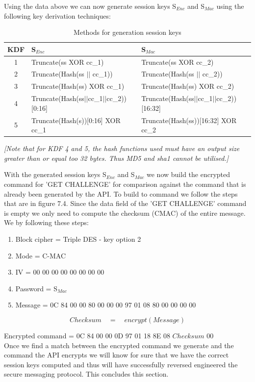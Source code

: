 \documentclass[bsc,frontabs,twoside,singlespacing,parskip,deptreport]{infthesis}     %
\begin{document}
Using the data above we can now generate session keys S$_{Enc}$ and S$_{Mac}$ using the following key derivation techniques:

\begin{table}[H]
\begin{tabular}{|c|l|l|}
\hline
KDF & S$_{Enc}$ & S$_{Mac}$\\
\hline
1 & Truncate(ss XOR cc\_1) & Truncate(ss XOR cc\_2)\\
\hline
2 & Truncate(Hash(ss $||$ cc\_1)) & Truncate(Hash(ss $||$ cc\_2)) \\
\hline
3 & Truncate(Hash(ss) XOR cc\_1) & Truncate(Hash(ss) XOR cc\_2)\\
\hline
4 & Truncate(Hash(ss$||$cc\_1$||$cc\_2))[0:16] & Truncate(Hash(ss$||$cc\_1$||$cc\_2))[16:32]\\
\hline
5 & Truncate(Hash(s))[0:16] XOR cc\_1 & Truncate(Hash(ss))[16:32] XOR cc\_2\\
\hline
\end{tabular}
\caption{Methods for generation session keys}
\end{table}

\textit{[Note that for KDF 4 and 5, the hash functions used must have an output size greater than or equal too 32 bytes. Thus MD5 and sha1 cannot be utilised.]}

With the generated session keys S$_{Enc}$ and S$_{Mac}$ we now build the encrypted command for 'GET CHALLENGE' for comparison against the command that is already been generated by the API. To build to command we follow the steps that are in figure 7.4. Since the data field of the 'GET CHALLENGE' command is empty we only need to compute the checksum (CMAC) of the entire message. We by following these steps:

\begin{enumerate}
\item Block cipher = Triple DES - key option 2
\item Mode = C-MAC
\item IV = 00 00 00 00 00 00 00 00 
\item Password = S$_{Mac}$
\item Message = 0C 84 00 00 80 00 00 00 97 01 08 80 00 00 00 00
\end{enumerate}

$$ Checksum \quad = \quad encrypt(Message) $$

Encrypted command = 0C 84 00 00 0D 97 01 18 8E 08 $Checksum$ 00\\

Once we find a match between the encrypted command we generate and the command the API encrypts we will know for sure that we have the correct session keys computed and thus will have successfully reversed engineered the secure messaging protocol. This concludes this section.
\end{document}
